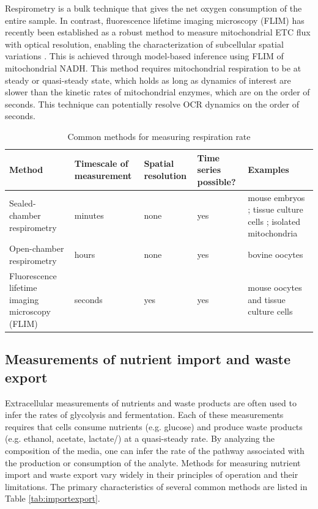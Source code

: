 \documentclass{compactarticle}
\begin{document}
Respirometry is a bulk technique that gives the net oxygen consumption of the entire sample. In contrast, fluorescence lifetime imaging microscopy (FLIM) has recently been established as a robust method to measure mitochondrial ETC flux with optical resolution, enabling the characterization of subcellular spatial variations \cite{Yang2021elife}. This is achieved through model-based inference using FLIM of mitochondrial NADH. This method requires mitochondrial respiration to be at steady or quasi-steady state, which holds as long as dynamics of interest are slower than the kinetic rates of mitochondrial enzymes, which are on the order of seconds. This technique can potentially resolve OCR dynamics on the order of seconds. 

\begin{table}[h]
\caption{Common methods for measuring respiration rate}
\label{tab:respiration}
\begin{center}
\begin{tabular}{|m{}|m{}|m{}|m{}|m{}|}
\hline
Method & Timescale of measurement & Spatial resolution & Time series possible? & Examples \\ \hline
Sealed-chamber respirometry & minutes & none & yes & mouse embryos \cite{houghton1996}; tissue culture cells \cite{ferrick2008}; isolated mitochondria \cite{gnaiger2000} \\ \hline
Open-chamber respirometry & hours & none & yes & bovine oocytes \cite{lopez2005} \\ \hline
Fluorescence lifetime imaging microscopy (FLIM) & seconds & yes & yes & mouse oocytes and tissue culture cells \cite{Yang2021elife} \\ \hline
\end{tabular}
\end{center}
\end{table}


\subsection{Measurements of nutrient import and waste export}
\label{sec:methods_extracellular}

Extracellular measurements of nutrients and waste products are often used to infer the rates of glycolysis and fermentation. Each of these measurements requires that cells consume nutrients (e.g. glucose) and produce waste products (e.g. ethanol, acetate, lactate/) at a quasi-steady rate. By analyzing the composition of the media, one can infer the rate of the pathway associated with the production or consumption of the analyte.
Methods for measuring nutrient import and waste export vary widely in their principles of operation and their limitations. The primary characteristics of several common methods are listed in Table \ref{tab:importexport}. 
\end{document}
